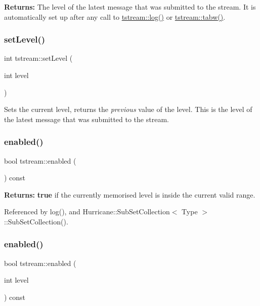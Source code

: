 {\bfseries Returns\+:} The level of the latest message that was submitted to the stream. It is automatically set up after any call to \hyperlink{clasststream_a1fe9745dc492e891a6e765e34fa082c3}{tstream\+::log()} or \hyperlink{clasststream_a5aa7a21d7b95f1bf40e68b5b13118fd0}{tstream\+::tabw()}. \mbox{\label{clasststream_a37fa7894d7ae83674ee7cb5a69a4c4a5}} 
\subsubsection{\texorpdfstring{set\+Level()}{setLevel()}}
{\footnotesize\ttfamily int tstream\+::set\+Level (\begin{DoxyParamCaption}\item[{int}]{level }\end{DoxyParamCaption})\hspace{0.3cm}{\ttfamily [inline]}}

Sets the current level, returns the {\itshape previous} value of the level. This is the level of the latest message that was submitted to the stream. \mbox{\label{clasststream_a01303d5c2c5cd83d06985622ca50d77b}} 
\subsubsection{\texorpdfstring{enabled()}{enabled()}\hspace{0.1cm}{\footnotesize\ttfamily [1/2]}}
{\footnotesize\ttfamily bool tstream\+::enabled (\begin{DoxyParamCaption}{ }\end{DoxyParamCaption}) const\hspace{0.3cm}{\ttfamily [inline]}}

{\bfseries Returns\+:} {\bfseries true} if the currently memorised level is inside the current valid range. 

Referenced by log(), and Hurricane\+::\+Sub\+Set\+Collection$<$ Type $>$\+::\+Sub\+Set\+Collection().

\mbox{\label{clasststream_a3dab6aeefd316ad326a29cec3c2c574b}} 
\subsubsection{\texorpdfstring{enabled()}{enabled()}\hspace{0.1cm}{\footnotesize\ttfamily [2/2]}}
{\footnotesize\ttfamily bool tstream\+::enabled (\begin{DoxyParamCaption}\item[{int}]{level }\end{DoxyParamCaption}) const\hspace{0.3cm}{\ttfamily [inline]}}

